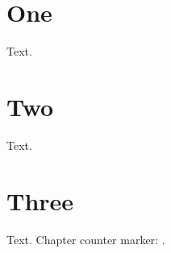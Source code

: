 \documentclass[a4paper,12pt]{report}
\begin{document}
\chapter{One}
Text.
\chapter{Two}
Text.
\chapter{Three}
Text.
\bibliographyChapter
Chapter counter marker: \chapterCount{}.
\end{document}
